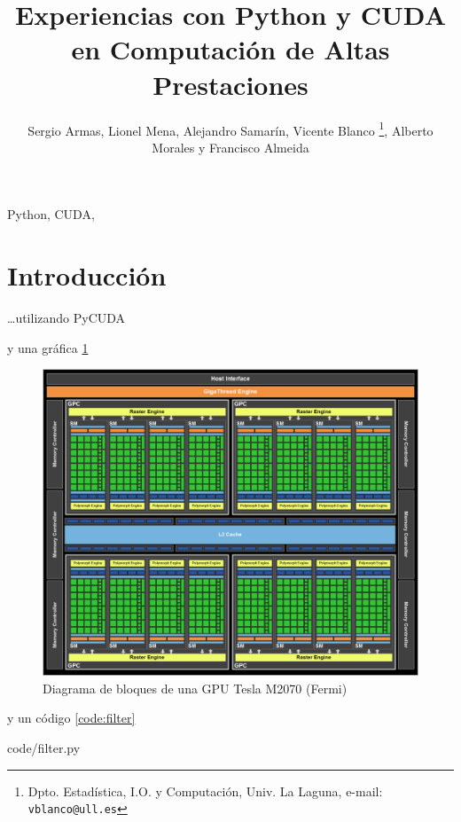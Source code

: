 \documentclass[twocolumn,twoside]{Jornadas}
\begin{document}
\title{Experiencias con Python y CUDA en Computación de Altas Prestaciones}

\author{Sergio Armas,%
     Lionel Mena,%
     Alejandro Samarín,%
     Vicente Blanco%
     \thanks{Dpto. Estadística, I.O. y Computación, Univ. La Laguna, e-mail: {\tt vblanco@ull.es}},%
     Alberto Morales y %
     Francisco Almeida
}

\maketitle
\markboth{}{}
\pagestyle{empty} 
\thispagestyle{empty} %

\begin{abstract}

\end{abstract}

\begin{keywords}
Python, CUDA, 
\end{keywords}

\section{Introducción}

\ldots utilizando PyCUDA~\cite{DBLP:journals/corr/abs-0911-3456}

y una gráfica \ref{fig:Fermi}

\begin{figure}
	\includegraphics[width=.45\textwidth]{block_diagram_Fermi}
	\caption{\label{fig:Fermi} Diagrama de bloques de una GPU Tesla M2070 (Fermi)}
\end{figure}

y un código \ref{code:filter}

%
   {code/filter.py}



\end{document}
